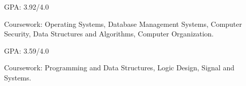 \newcommand{\TUBentry}{
    \TUB
    \poswithprd{Introduction to 3D Scanning and Printing at TUB Winter University}{Jan 2018-Feb 2018}
    \begin{itemize}
        \item 
        Learned the basic of 3D scanning \& printing. Learned Blender for 3D modeling.
    \end{itemize}
}



\UM
{}
\begin{miniItemize}
    \item GPA: 3.92/4.0
    \item Coursework: 
        Operating Systems,
        Database Management Systems,
        Computer Security,
        Data Structures and Algorithms,
        Computer Organization.
\end{miniItemize}

\JI
{}
\begin{miniItemize}
    \item GPA: 3.59/4.0
    \item Coursework:
        Programming and Data Structures,
        Logic Design,
        Signal and Systems.
\end{miniItemize}

